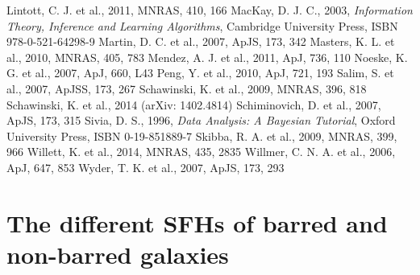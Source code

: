 \documentclass{mn2e}
\begin{document}
\begin{thebibliography}{}
 Lintott, C. J. et al., 2011, MNRAS, 410, 166
 MacKay, D. J. C., 2003, \emph{Information Theory, Inference and Learning Algorithms}, Cambridge University Press, ISBN 978-0-521-64298-9
 Martin, D. C. et al., 2007, ApJS, 173, 342
 Masters, K. L. et al., 2010, MNRAS, 405, 783
 Mendez, A. J. et al., 2011, ApJ, 736, 110
 Noeske, K. G. et al., 2007, ApJ, 660, L43
 Peng, Y. et al., 2010, ApJ, 721, 193
 Salim, S. et al., 2007, ApJSS, 173, 267
 Schawinski, K. et al., 2009, MNRAS, 396, 818
 Schawinski, K. et al., 2014 (arXiv: 1402.4814)
 Schiminovich, D. et al., 2007, ApJS, 173, 315
 Sivia, D. S., 1996, \emph{Data Analysis: A Bayesian Tutorial}, Oxford University Press, ISBN 0-19-851889-7
 Skibba, R. A. et al., 2009, MNRAS, 399, 966
 Willett, K. et al., 2014, MNRAS, 435, 2835
 Willmer, C. N. A. et al., 2006, ApJ, 647, 853
 Wyder, T. K. et al., 2007, ApJS, 173, 293
\end{thebibliography}{}


\appendix
\section{The different SFHs of barred and non-barred galaxies}
\end{document}
